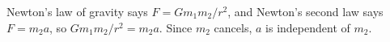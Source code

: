Newton's law of gravity says $F=Gm_1 m_2/r^2$, and
Newton's second law says $F=m_2 a$, so $Gm_1 m_2/r^2=m_2 a$.
 Since $m_2$ cancels, $a$ is independent of $m_2$.



